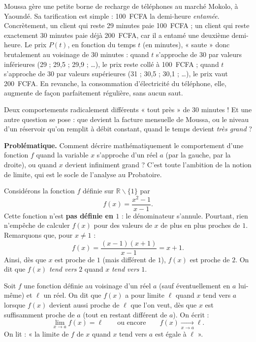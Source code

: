 \documentclass[11pt]{article}
\newcommand{\cle}[1]{{\popxbold\color{popdark}#1}}
\newcounter{popsec}
\newcounter{popsub}
\newcommand{\courssub}[1]{%
  \stepcounter{popsub}%
  \par\vspace{9pt}\noindent{\popxbold\fontsize{11.5}{13}\selectfont\color{popink}{\color{poporange}\thepopsec.\thepopsub}\hspace{6pt}#1}\par\nopagebreak\vspace{4pt}
}
\def\setminus{\mathbin{\backslash}}\let\smallsetminus\setminus
\begin{document}
Moussa gère une petite borne de recharge de téléphones au marché Mokolo, à Yaoundé. Sa tarification est simple : \SI{100}{FCFA} la demi-heure \emph{entamée}. Concrètement, un client qui reste 29 minutes paie \SI{100}{FCFA} ; un client qui reste exactement 30 minutes paie déjà \SI{200}{FCFA}, car il a entamé une deuxième demi-heure. Le prix $P(t)$, en fonction du temps $t$ (en minutes), « saute » donc brutalement au voisinage de 30 minutes : quand $t$ s'approche de 30 par valeurs inférieures (29 ; 29,5 ; 29,9 ; \dots), le prix reste collé à \SI{100}{FCFA} ; quand $t$ s'approche de 30 par valeurs supérieures (31 ; 30,5 ; 30,1 ; \dots), le prix vaut \SI{200}{FCFA}. En revanche, la consommation d'électricité du téléphone, elle, augmente de façon parfaitement régulière, sans aucun saut.

Deux comportements radicalement différents « tout près » de 30 minutes ! Et une autre question se pose : que devient la facture mensuelle de Moussa, ou le niveau d'un réservoir qu'on remplit à débit constant, quand le temps devient \emph{très grand} ?

\textbf{Problématique.} Comment décrire mathématiquement le comportement d'une fonction $f$ quand la variable $x$ s'approche d'un réel $a$ (par la gauche, par la droite), ou quand $x$ devient infiniment grand ? C'est toute l'ambition de la notion de \cle{limite}, qui est le socle de l'analyse au Probatoire.

\courssub{L'idée intuitive : « s'approcher de »}

Considérons la fonction $f$ définie sur $\mathbb{R}\setminus\{1\}$ par
\[ f(x)=\frac{x^{2}-1}{x-1}. \]
Cette fonction n'est \textbf{pas définie en $1$} : le dénominateur s'annule. Pourtant, rien n'empêche de calculer $f(x)$ pour des valeurs de $x$ de plus en plus proches de $1$. Remarquons que, pour $x\neq 1$ :
\[ f(x)=\frac{(x-1)(x+1)}{x-1}=x+1. \]
Ainsi, dès que $x$ est proche de $1$ (mais différent de $1$), $f(x)$ est proche de $2$. On dit que $f(x)$ \emph{tend vers} $2$ quand $x$ \emph{tend vers} $1$.

\begin{definition}
Soit $f$ une fonction définie au voisinage d'un réel $a$ (sauf éventuellement en $a$ lui-même) et $\ell$ un réel. On dit que $f(x)$ a pour \cle{limite} $\ell$ quand $x$ tend vers $a$ lorsque $f(x)$ devient aussi proche de $\ell$ que l'on veut, dès que $x$ est suffisamment proche de $a$ (tout en restant différent de $a$). On écrit :
\[ \lim_{x\to a} f(x)=\ell \qquad \text{ou encore} \qquad f(x)\xrightarrow[x\to a]{} \ell. \]
On lit : « la limite de $f$ de $x$ quand $x$ tend vers $a$ est égale à $\ell$ ».
\end{definition}
\end{document}
